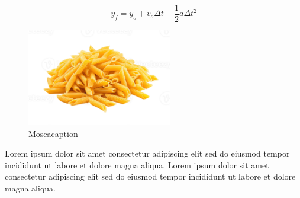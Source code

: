 \documentclass{article}
\begin{document}
		\begin{equation}
			y_f = y_o + v_o\Delta t + \frac{1}{2}a\Delta t^2
		\end{equation}

		\begin{figure}[H]
            \centering
            \includegraphics[width=2.5in]{mosca.png}
            \caption{Moscacaption}
            \label{fig:Moscalable}
        \end{figure}

		Lorem ipsum dolor sit amet consectetur adipiscing elit sed do eiusmod tempor incididunt ut labore et dolore magna aliqua. 
		Lorem ipsum dolor sit amet consectetur adipiscing elit sed do eiusmod tempor incididunt ut labore et dolore magna aliqua. 

\end{document}
